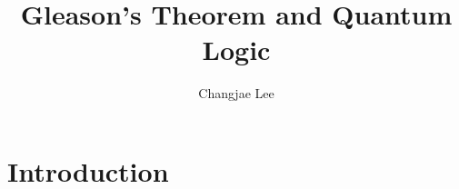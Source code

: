 \usepackage[11pt,a4paper]{report}

\title{Gleason's Theorem and Quantum Logic}
\author{Changjae Lee}



\tableofcontents

\chapter{Introduction}


